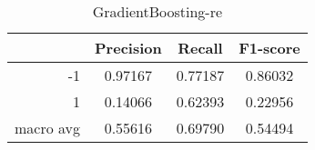 \begin{table}[!h]
    \centering
    \renewcommand{\arraystretch}{1.5}
    \begin{tabular}{|r|c|c|c|}
        \hline
                  & Precision & Recall & F1-score \\ \hline
        -1        &     0.97167     &     0.77187   &    0.86032      \\ \hline
        1         &     0.14066      &     0.62393   &   0.22956       \\ \hline
        macro avg &      0.55616     &     0.69790   &    0.54494      \\ \hline
    \end{tabular}
    \caption{GradientBoosting-re}
\end{table}
